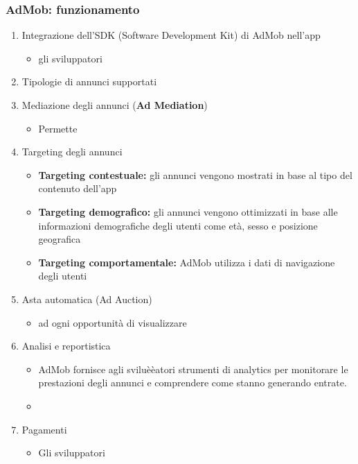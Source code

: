 \subsubsection{AdMob: funzionamento}
\begin{enumerate}
    \item Integrazione dell'SDK (Software Development Kit) di AdMob nell'app
    \begin{itemize}
        \item gli sviluppatori
    \end{itemize}
    \item Tipologie di annunci supportati
    \item Mediazione degli annunci (\textbf{Ad Mediation})
    \begin{itemize}
        \item Permette
    \end{itemize}
    \item Targeting degli annunci
    \begin{itemize}
        \item \textbf{Targeting contestuale:} gli annunci vengono mostrati in base al tipo del contenuto dell'app
        \item \textbf{Targeting demografico:} gli annunci vengono ottimizzati in base alle informazioni demografiche degli utenti come età, sesso e posizione geografica
        \item \textbf{Targeting comportamentale:} AdMob utilizza i dati di navigazione degli utenti 
    \end{itemize}
    \item Asta automatica (Ad Auction)
    \begin{itemize}
        \item ad ogni opportunità di visualizzare
    \end{itemize}
    \item Analisi e reportistica
    \begin{itemize}
        \item AdMob fornisce agli sviluèèatori strumenti di analytics per monitorare le prestazioni degli annunci e comprendere come stanno generando entrate.
        \item 
    \end{itemize}
    \item Pagamenti
    \begin{itemize}
        \item Gli sviluppatori
    \end{itemize}
\end{enumerate}

